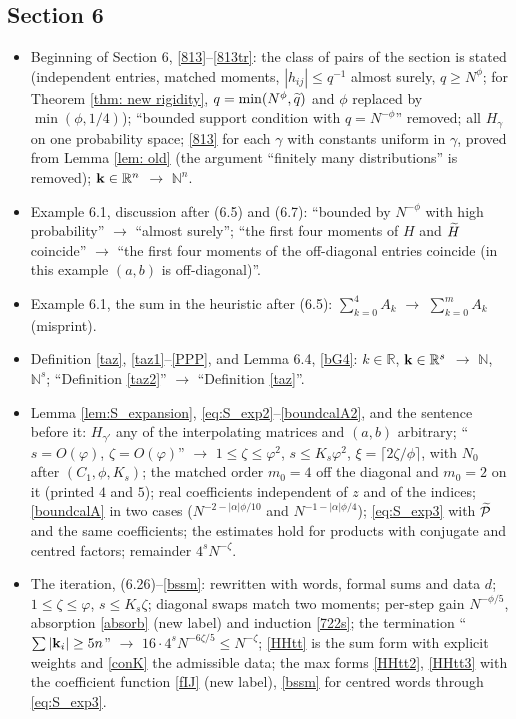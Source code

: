 \subsection*{Section 6}
\begin{itemize}
\item Beginning of Section 6, \eqref{813}--\eqref{813tr}: the class of pairs of the section is stated (independent entries, matched moments, $|h_{ij}|\le q^{-1}$ almost surely, $q\ge N^\phi$; for Theorem \ref{thm: new rigidity}, $q=\min(N^\phi,\widetilde q)$ and $\phi$ replaced by $\min(\phi,1/4)$); ``bounded support condition with $q=N^{-\phi}$'' removed; all $H_\gamma$ on one probability space; \eqref{813} for each $\gamma$ with constants uniform in $\gamma$, proved from Lemma \ref{lem: old} (the argument ``finitely many distributions'' is removed); ${\bf k}\in\mathbb R^n$ $\to$ $\mathbb N^n$.
\item Example 6.1, discussion after (6.5) and (6.7): ``bounded by $N^{-\phi}$ with high probability'' $\to$ ``almost surely''; ``the first four moments of $H$ and $\widetilde H$ coincide'' $\to$ ``the first four moments of the off-diagonal entries coincide (in this example $(a,b)$ is off-diagonal)''.
\item Example 6.1, the sum in the heuristic after (6.5): $\sum_{k=0}^4A_k$ $\to$ $\sum_{k=0}^mA_k$ (misprint).
\item Definition \ref{taz}, \eqref{taz1}--\eqref{PPP}, and Lemma 6.4, \eqref{bG4}: $k\in\mathbb R$, ${\bf k}\in\mathbb R^s$ $\to$ $\mathbb N$, $\mathbb N^s$; ``Definition \ref{taz2}'' $\to$ ``Definition \ref{taz}''.
\item Lemma \ref{lem:S_expansion}, \eqref{eq:S_exp2}--\eqref{boundcalA2}, and the sentence before it: $H_{\gamma'}$ any of the interpolating matrices and $(a,b)$ arbitrary; ``$s=O(\varphi)$, $\zeta=O(\varphi)$'' $\to$ $1\le\zeta\le\varphi^2$, $s\le K_s\varphi^2$, $\xi=\lceil2\zeta/\phi\rceil$, with $N_0$ after $(C_1,\phi,K_s)$; the matched order $m_0=4$ off the diagonal and $m_0=2$ on it (printed $4$ and $5$); real coefficients independent of $z$ and of the indices; \eqref{boundcalA} in two cases ($N^{-2-|\alpha|\phi/10}$ and $N^{-1-|\alpha|\phi/4}$); \eqref{eq:S_exp3} with $\widetilde{\mathcal P}$ and the same coefficients; the estimates hold for products with conjugate and centred factors; remainder $4^sN^{-\zeta}$.
\item The iteration, (6.26)--\eqref{bssm}: rewritten with words, formal sums and data $d$; $1\le\zeta\le\varphi$, $s\le K_s\zeta$; diagonal swaps match two moments; per-step gain $N^{-\phi/5}$, absorption \eqref{absorb} (new label) and induction \eqref{722s}; the termination ``$\sum|{\bf k}_i|\ge5n$'' $\to$ $16\cdot4^sN^{-6\zeta/5}\le N^{-\zeta}$; \eqref{HHtt} is the sum form with explicit weights and \eqref{conK} the admissible data; the max forms \eqref{HHtt2}, \eqref{HHtt3} with the coefficient function \eqref{fIJ} (new label), \eqref{bssm} for centred words through \eqref{eq:S_exp3}.

\end{itemize}
